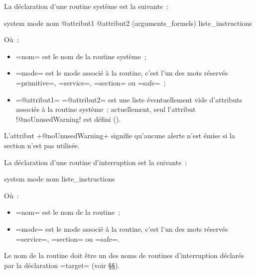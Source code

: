 La déclaration d'une routine système est la suivante~:
\begin{PLM}
system mode nom @attribut1 @attribut2 (arguments_formels) {
  liste_instructions
}
\end{PLM}
Où~:
\begin{itemize}
  \item \plm=nom= est le nom de la routine système~;
  \item \plm=mode= est le mode associé à la routine, c'est l'un des mots réservés \plm=primitive=, \plm=service=, \plm=section= ou \plm=safe=~;
  \item \plm=@attribut1= \plm=@attribut2= est une liste éventuellement vide d'attributs associés à la routine système~; actuellement, seul l'attribut \plm!@noUnusedWarning! est défini ().
\end{itemize}











L'attribut \plm+@noUnusedWarning+ signifie qu'aucune alerte n'est émise si la section n'est pas utilisée.





















La déclaration d'une routine d'interruption est la suivante~:
\begin{PLM}
system mode nom {
  liste_instructions
}
\end{PLM}
Où~:
\begin{itemize}
  \item \plm=nom= est le nom de la routine~;
  \item \plm=mode= est le mode associé à la routine, c'est l'un des mots réservés \plm=service=, \plm=section= ou \plm=safe=.
\end{itemize}

Le nom de la routine doit être un des noms de routines d'interruption déclarés par la déclaration \plm=target= (voir §§).

